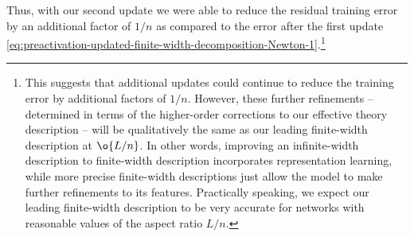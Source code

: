 Thus, with our second update we were able to reduce the residual training error by an additional factor of $1/n$ as compared to the error after the first update \eqref{eq:preactivation-updated-finite-width-decomposition-Newton-1}.\footnote{
This suggests that additional updates
could continue to reduce the training error by additional factors of $1/n$. However, these further refinements -- determined in terms of the higher-order corrections to our effective theory description -- will be qualitatively the same as our leading finite-width description at $\o{L/n}$. In other words, improving an infinite-width description to finite-width description incorporates representation learning, while more precise finite-width descriptions just allow the model to make further refinements to its features. Practically speaking, we expect our leading finite-width description to be very accurate for networks with reasonable values of the aspect ratio $L/n$.
}









